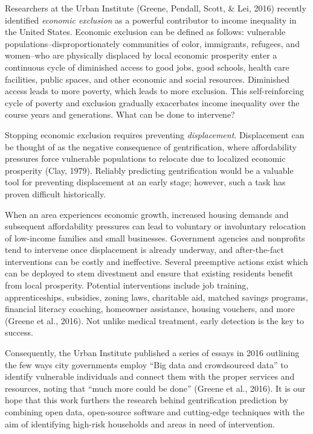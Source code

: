 \documentclass[conference,final,]{IEEEtran}
\begin{document}
Researchers at the Urban Institute (Greene, Pendall, Scott, \& Lei,
2016) recently identified \emph{economic exclusion} as a powerful
contributor to income inequality in the United States. Economic
exclusion can be defined as follows: vulnerable
populations--disproportionately communities of color, immigrants,
refugees, and women--who are physically displaced by local economic
prosperity enter a continuous cycle of diminished access to good jobs,
good schools, health care facilities, public spaces, and other economic
and social resources. Diminished access leads to more poverty, which
leads to more exclusion. This self-reinforcing cycle of poverty and
exclusion gradually exacerbates income inequality over the course years
and generations. What can be done to intervene?

Stopping economic exclusion requires preventing \emph{displacement}.
Displacement can be thought of as the negative consequence of
gentrification, where affordability pressures force vulnerable
populations to relocate due to localized economic prosperity (Clay,
1979). Reliably predicting gentrification would be a valuable tool for
preventing displacement at an early stage; however, such a task has
proven difficult historically.

When an area experiences economic growth, increased housing demands and
subsequent affordability pressures can lead to voluntary or involuntary
relocation of low-income families and small businesses. Government
agencies and nonprofits tend to intervene once displacement is already
underway, and after-the-fact interventions can be costly and
ineffective. Several preemptive actions exist which can be deployed to
stem divestment and ensure that existing residents benefit from local
prosperity. Potential interventions include job training,
apprenticeships, subsidies, zoning laws, charitable aid, matched savings
programs, financial literacy coaching, homeowner assistance, housing
vouchers, and more (Greene et al., 2016). Not unlike medical treatment,
early detection is the key to success.

Consequently, the Urban Institute published a series of essays in 2016
outlining the few ways city governments employ ``Big data and
crowdsourced data'' to identify vulnerable individuals and connect them
with the proper services and resources, noting that ``much more could be
done'' (Greene et al., 2016). It is our hope that this work furthers the
research behind gentrification prediction by combining open data,
open-source software and cutting-edge techniques with the aim of
identifying high-risk households and areas in need of intervention.
\end{document}

